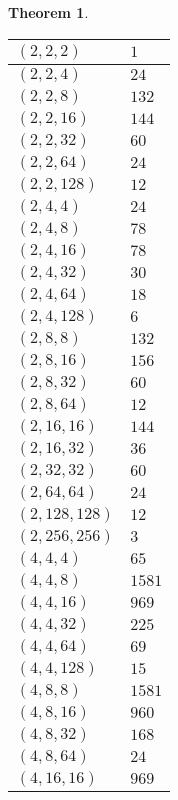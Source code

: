 \documentclass{dcthesis}
\numberwithin{equation}{section}
\newtheorem{theorem}[equation]{Theorem}
\theoremstyle{definition}
\theoremstyle{remark}
\begin{document}
{{{\begin{theorem}
\begin{longtable}{|l|l|}
        $(2,2,2)$ & $1$ \\ \hline
        $(2,2,4)$ & $24$ \\ \hline
        $(2,2,8)$ & $132$ \\ \hline
        $(2,2,16)$ & $144$ \\ \hline
        $(2,2,32)$ & $60$ \\ \hline
        $(2,2,64)$ & $24$ \\ \hline
        $(2,2,128)$ & $12$ \\ \hline
        $(2,4,4)$ & $24$ \\ \hline
        $(2,4,8)$ & $78$ \\ \hline
        $(2,4,16)$ & $78$ \\ \hline
        $(2,4,32)$ & $30$ \\ \hline
        $(2,4,64)$ & $18$ \\ \hline
        $(2,4,128)$ & $6$ \\ \hline
        $(2,8,8)$ & $132$ \\ \hline
        $(2,8,16)$ & $156$ \\ \hline
        $(2,8,32)$ & $60$ \\ \hline
        $(2,8,64)$ & $12$ \\ \hline
        $(2,16,16)$ & $144$ \\ \hline
        $(2,16,32)$ & $36$ \\ \hline
        $(2,32,32)$ & $60$ \\ \hline
        $(2,64,64)$ & $24$ \\ \hline
        $(2,128,128)$ & $12$ \\ \hline
        $(2,256,256)$ & $3$ \\ \hline
        $(4,4,4)$ & $65$ \\ \hline
        $(4,4,8)$ & $1581$ \\ \hline
        $(4,4,16)$ & $969$ \\ \hline
        $(4,4,32)$ & $225$ \\ \hline
        $(4,4,64)$ & $69$ \\ \hline
        $(4,4,128)$ & $15$ \\ \hline
        $(4,8,8)$ & $1581$ \\ \hline
        $(4,8,16)$ & $960$ \\ \hline
        $(4,8,32)$ & $168$ \\ \hline
        $(4,8,64)$ & $24$ \\ \hline
        $(4,16,16)$ & $969$ \\ \hline

\end{longtable}
\end{theorem}}}}
\end{document}
